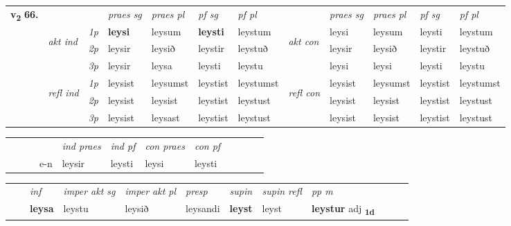 \begin{tabular}{llllllllllll} \toprule
\multirow{4}{*}{{{\textbf{v{\textsubscript{2}}} \Large{\textbf{66.}}}}}  & &   &  \textit{praes sg}  & \textit{praes pl}  &\textit{ pf sg} & \textit{pf pl} &  &  \textit{praes sg}  & \textit{praes pl}  & \textit{pf sg} & \textit{pf pl } \\*
	\cmidrule{4-7} \cmidrule{9-12}
 & \multirow{3}{*}{\begin{turn}{90}\textit{akt ind}\end{turn}} & {\textit{1p}} & \textbf{leysi} & leysum    & \textbf{leysti} & leystum & \multirow{3}{*}{\begin{turn}{90}\textit{akt con}\end{turn}} &leysi & leysum & leysti & leystum\\*
& &  {\textit{2p}} &  leysir  & leysið   & leystir & leystuð & & leysir & leysið & leystir & leystuð \\*
& &  {\textit{3p}} & leysir & leysa   & leysti & leystu & & leysi & leysi& leysti & leystu  \\*
\cmidrule{4-7} \cmidrule{9-12}
 &\multirow{3}{*}{\begin{turn}{90}\textit{refl ind}\end{turn}} & {\textit{1p}} & leysist & leysumst    & leystist & leystumst & \multirow{3}{*}{\begin{turn}{90}\textit{refl con}\end{turn}}  &leysist & leysumst & leystist & leystumst\\*
 &&  {\textit{2p}} &  leysist  & leysist   & leystist & leystust & &leysist & leysist & leystist & leystust \\*
& &  {\textit{3p}} & leysist & leysast   & leystist & leystust & & leysist & leysist& leystist & leystust  \\*
\cmidrule{4-7} \cmidrule{9-12}
\end{tabular}


\begin{tabular}{llllllllllll}
 & &  & &  \textit{ind praes} & \textit{ind pf} & \textit{con praes} & \textit{con pf} \\*
&  & & e-n & leysir & leysti & leysi & leysti \\*
\cmidrule{5-9}
\end{tabular}


\begin{tabular}{llllllllllll}
 & & \textit{inf} & \textit{imper akt sg} & \textit{imper akt pl}   & \textit{presp} & \textit{supin} & \textit{supin refl} & \textit{pp m}     \\*
  & & \textbf{leysa} & leystu  & leysið   & leysandi &  \textbf{leyst} & leyst & \textbf{leystur} adj \textbf{\textsubscript{1d}} \\*
\cmidrule{1-12}
\end{tabular}



